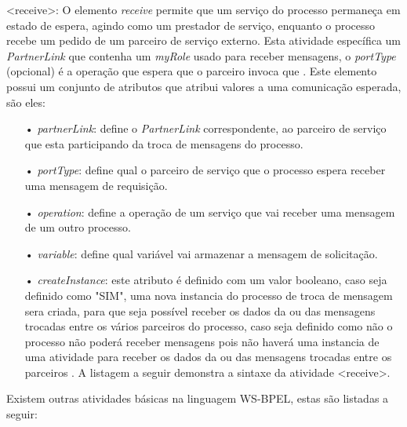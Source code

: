 

<receive>: O elemento \textit{receive} permite que um serviço do processo permaneça em estado de espera, agindo como um prestador de serviço, enquanto o processo recebe um pedido de um parceiro de serviço externo. Esta atividade específica um \textit{PartnerLink} que contenha um \textit{myRole} usado para receber mensagens, o \textit{portType} (opcional) é a operação que espera que o parceiro invoca que \cite{BPEL20}. Este elemento possui um conjunto de atributos que atribui valores a uma comunicação esperada, são eles: 

\begin{itemize}

\item[•] \textit{partnerLink}: define o \textit{PartnerLink} correspondente, ao parceiro de serviço que esta participando da troca de mensagens do processo.

\item[•] \textit{portType}: define qual o parceiro de serviço que o processo espera receber uma mensagem de requisição.
 
\item[•] \textit{operation}: define a operação de um serviço que vai receber uma mensagem de um outro processo.

\item[•] \textit{variable}: define qual variável vai armazenar a mensagem de solicitação.

\item[•] \textit{createInstance}: este atributo é definido com um valor booleano, caso seja definido como "SIM", uma nova instancia do processo de troca de mensagem sera criada, para que seja possível receber os dados da ou das mensagens trocadas entre os vários parceiros do processo, caso seja definido como não o processo não poderá receber mensagens pois não haverá uma instancia de uma atividade para receber os dados da ou das mensagens trocadas entre os parceiros \cite{BPEL20}. A listagem a seguir demonstra a sintaxe da atividade <receive>.

\end{itemize}



Existem outras atividades básicas na linguagem WS-BPEL, estas são listadas a seguir:

